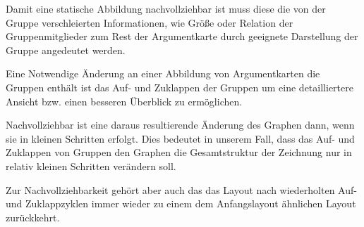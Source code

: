 Damit eine statische Abbildung nachvollziehbar ist muss diese die von der Gruppe verschleierten Informationen, wie Größe oder Relation der Gruppenmitglieder zum Rest der Argumentkarte durch geeignete Darstellung der Gruppe angedeutet werden.

Eine Notwendige Änderung an einer Abbildung von Argumentkarten die Gruppen enthält ist das Auf- und Zuklappen der Gruppen um eine detailliertere Ansicht bzw. einen besseren Überblick zu ermöglichen.

Nachvollziehbar ist eine daraus resultierende Änderung des Graphen dann, wenn sie in kleinen Schritten erfolgt. Dies bedeutet in unserem Fall, dass das Auf- und Zuklappen von Gruppen den Graphen die Gesamtstruktur der Zeichnung nur in relativ kleinen Schritten verändern soll.

Zur Nachvollziehbarkeit gehört aber auch das das Layout nach wiederholten Auf- und Zuklappzyklen immer wieder zu einem dem Anfangslayout ähnlichen Layout zurückkehrt.


%
%
%
%
%

	

